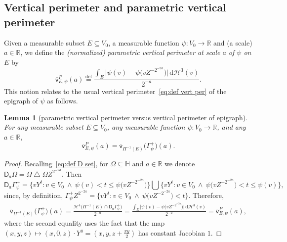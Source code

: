 \documentclass[11pt,reqno]{amsart}
\renewcommand{\H}{\mathbb{H}}
\newcommand{\R}{\mathbb{R}}
\newcommand{\cH}{\mathcal{H}}
\newcommand{\ud}[0]{\,\mathrm{d}}
\newcommand{\0}{\mathbf{0}}
\renewcommand{\1}{\mathbf 1}
\newcommand{\from}{\colon}
\newcommand{\symdiff}{\mathbin{\triangle}}
\renewcommand{\mid}{:}
\renewcommand{\subset}{\subseteq}
\newcommand{\eqdef}{\stackrel{\mathrm{def}}{=}}
\renewcommand{\le}{\leqslant}
\newtheorem{lemma}[thm]{Lemma}
\theoremstyle{remark}
\newcommand{\vpfl}[1]{{\overline{\mathsf{v}}_{\!#1}}}
\newcommand{\vpP}[1]{{\overline{\mathsf{v}}^{P}_{\!#1}}}
\begin{document}
\subsection{Vertical perimeter and parametric vertical perimeter} Given a measurable subset $E\subset V_0$, a measurable function  $\psi\from V_0\to \R$ and (a scale)  $a\in \R$, we define the {\em (normalized) parametric vertical perimeter at scale $a$  of $\psi$ on $E$} by
\begin{equation}\label{eq:def par vert perimeter}
\vpP{E,\psi}(a)\eqdef \frac{\int_E \big|\psi(v)-\psi\big(v Z^{-2^{-2a}}\big)\big|\ud \cH^3(v)}{2^{-a}}.
\end{equation}
This notion relates to the usual vertical perimeter~\eqref{eq:def vert per}  of the epigraph of $\psi$ as follows.
\begin{lemma}[parametric vertical perimeter versus vertical perimeter of epigraph]\label{lem:vpP and vpfl}
  For any measurable subset $E\subset V_0$, any measurable function $\psi\from V_0\to \R$, and any $a\in \R$, $$\vpP{E,\psi}(a)=\vpfl{\Pi^{-1}(E)}\big(\Gamma_\psi^+\big)(a).$$
\end{lemma}
\begin{proof}
  Recalling~\eqref{eq:def D set},  for $\Omega\subset \H$ and $a\in \R$ we denote $\mathsf{D}_a\Omega= \Omega \symdiff \Omega Z^{2^{-2a}}$.  Then
    \begin{equation*}
    \mathsf{D}_a\Gamma_\psi^+ = \big\{v Y^t \mid v\in V_0\ \wedge\  \psi(v)< t \le \psi\big(vZ^{-2^{-2a}}\big)\big\}
    \bigcup \big\{v Y^t \mid v\in V_0 \ \wedge\  \psi\big(vZ^{-2^{-2a}}\big) < t \le \psi(v)\big\},
  \end{equation*}
  since, by definition, $\Gamma_\psi^+ Z^{2^{-2a}}=\big\{v Y^t \mid v\in V_0\ \wedge\  \psi\big(vZ^{-2^{-2a}}\big)<t\big\}$.  Therefore,
  \begin{align*}
    \vpfl{\Pi^{-1}(E)}\big(\Gamma_\psi^+\big)(a)
    = \frac{\cH^4\big(\Pi^{-1}(E)\cap \mathsf{D}_a\Gamma^+_\psi\big)}{2^{-a}}
     =\frac{\int_{E} \big|\psi(v)-\psi\big(v Z^{-2^{-2a}}\big)\big|\ud \cH^3(v)}{2^{-a}}
    =\vpP{E,\psi}(a),
  \end{align*}
  where the second equality uses the fact that the map $(x,y,z)\mapsto (x,0,z)\cdot Y^y = (x,y,z+\frac{xy}{2})$ has constant Jacobian $1$.
\end{proof}
\end{document}

